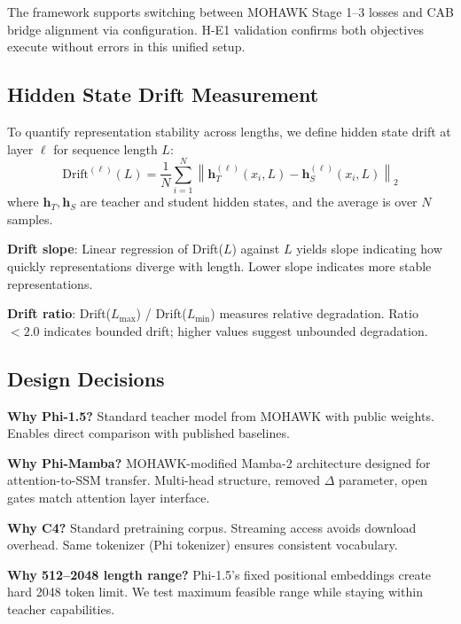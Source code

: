 The framework supports switching between MOHAWK Stage 1--3 losses and CAB bridge alignment via configuration. H-E1 validation confirms both objectives execute without errors in this unified setup.

\subsection{Hidden State Drift Measurement}

To quantify representation stability across lengths, we define hidden state drift at layer $\ell$ for sequence length $L$:
\begin{equation}
\text{Drift}^{(\ell)}(L) = \frac{1}{N} \sum_{i=1}^{N} \left\| \mathbf{h}_T^{(\ell)}(x_i, L) - \mathbf{h}_S^{(\ell)}(x_i, L) \right\|_2
\end{equation}
where $\mathbf{h}_T, \mathbf{h}_S$ are teacher and student hidden states, and the average is over $N$ samples.

\textbf{Drift slope}: Linear regression of Drift($L$) against $L$ yields slope indicating how quickly representations diverge with length. Lower slope indicates more stable representations.

\textbf{Drift ratio}: Drift($L_{\max}$) / Drift($L_{\min}$) measures relative degradation. Ratio $< 2.0$ indicates bounded drift; higher values suggest unbounded degradation.

\subsection{Design Decisions}

\textbf{Why Phi-1.5?} Standard teacher model from MOHAWK with public weights. Enables direct comparison with published baselines.

\textbf{Why Phi-Mamba?} MOHAWK-modified Mamba-2 architecture designed for attention-to-SSM transfer. Multi-head structure, removed $\Delta$ parameter, open gates match attention layer interface.

\textbf{Why C4?} Standard pretraining corpus. Streaming access avoids download overhead. Same tokenizer (Phi tokenizer) ensures consistent vocabulary.

\textbf{Why 512--2048 length range?} Phi-1.5's fixed positional embeddings create hard 2048 token limit. We test maximum feasible range while staying within teacher capabilities.
